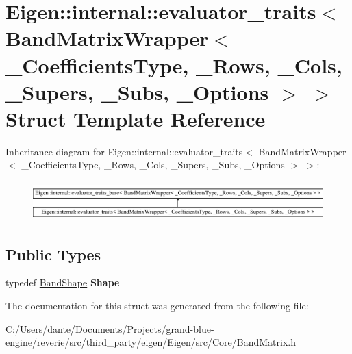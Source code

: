 \hypertarget{struct_eigen_1_1internal_1_1evaluator__traits_3_01_band_matrix_wrapper_3_01___coefficients_type_cee9d317520cda5230220118c896281a}{}\section{Eigen\+::internal\+::evaluator\+\_\+traits$<$ Band\+Matrix\+Wrapper$<$ \+\_\+\+Coefficients\+Type, \+\_\+\+Rows, \+\_\+\+Cols, \+\_\+\+Supers, \+\_\+\+Subs, \+\_\+\+Options $>$ $>$ Struct Template Reference}
\label{struct_eigen_1_1internal_1_1evaluator__traits_3_01_band_matrix_wrapper_3_01___coefficients_type_cee9d317520cda5230220118c896281a}
Inheritance diagram for Eigen\+::internal\+::evaluator\+\_\+traits$<$ Band\+Matrix\+Wrapper$<$ \+\_\+\+Coefficients\+Type, \+\_\+\+Rows, \+\_\+\+Cols, \+\_\+\+Supers, \+\_\+\+Subs, \+\_\+\+Options $>$ $>$\+:\begin{figure}[H]
\begin{center}
\leavevmode
\includegraphics[height=1.521739cm]{struct_eigen_1_1internal_1_1evaluator__traits_3_01_band_matrix_wrapper_3_01___coefficients_type_cee9d317520cda5230220118c896281a}
\end{center}
\end{figure}
\subsection*{Public Types}
\begin{DoxyCompactItemize}
\item 
\mbox{\label{struct_eigen_1_1internal_1_1evaluator__traits_3_01_band_matrix_wrapper_3_01___coefficients_type_cee9d317520cda5230220118c896281a_a4c8104880ecefd0e1b820cfe7d980af3}} 
typedef \mbox{\hyperlink{struct_eigen_1_1internal_1_1_band_shape}{Band\+Shape}} {\bfseries Shape}
\end{DoxyCompactItemize}


The documentation for this struct was generated from the following file\+:\begin{DoxyCompactItemize}
\item 
C\+:/\+Users/dante/\+Documents/\+Projects/grand-\/blue-\/engine/reverie/src/third\+\_\+party/eigen/\+Eigen/src/\+Core/Band\+Matrix.\+h\end{DoxyCompactItemize}
